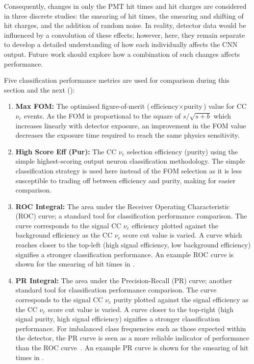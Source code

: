 Consequently, changes in only the PMT hit times and hit charges are considered in three discrete
studies: the smearing of hit times, the smearing and shifting of hit charges, and the addition of
random noise. In reality, detector data would be influenced by a convolution of these effects;
however, here, they remain separate to develop a detailed understanding of how each individually
affects the CNN output. Future work should explore how a combination of such changes affects
performance.

Five classification performance metrics are used for comparison during this section and the next
():
\begin{enumerate}
    \item \textbf{Max FOM:} The optimised figure-of-merit ($\text{efficiency}\times\text{purity}$)
          value for CC $\nu_{e}$ events. As the FOM is proportional to the square of
          $s/\sqrt{s+b}$ which increases linearly with detector exposure, an improvement in the
          FOM value decreases the exposure time required to reach the same physics sensitivity.
    \item \textbf{High Score Eff (Pur):} The CC $\nu_{e}$ selection efficiency (purity) using the
          simple highest-scoring output neuron classification methodology. The simple
          classification strategy is used here instead of the FOM selection as it is less
          susceptible to trading off between efficiency and purity, making for easier comparison.
    \item \textbf{ROC Integral:} The area under the Receiver Operating Characteristic (ROC) curve;
          a standard tool for classification performance comparison. The curve corresponds to the
          signal CC $\nu_{e}$ efficiency plotted against the background efficiency as the CC
          $\nu_{e}$ score cut value is varied. A curve which reaches closer to the top-left (high
          signal efficiency, low background efficiency) signifies a stronger classification
          performance. An example ROC curve is shown for the smearing of hit times in
          .
    \item \textbf{PR Integral:} The area under the Precision-Recall (PR) curve; another standard
          tool for classification performance comparison. The curve corresponds to the signal CC
          $\nu_{e}$ purity plotted against the signal efficiency as the CC $\nu_{e}$ score cut
          value is varied. A curve closer to the top-right (high signal purity, high signal
          efficiency) signifies a stronger classification performance. For imbalanced class
          frequencies such as those expected within the \chipsfive detector, the PR curve is seen
          as a more reliable indicator of performance than the ROC curve~\cite{saito2015}. An
          example PR curve is shown for the smearing of hit times in
          .
\end{enumerate}

